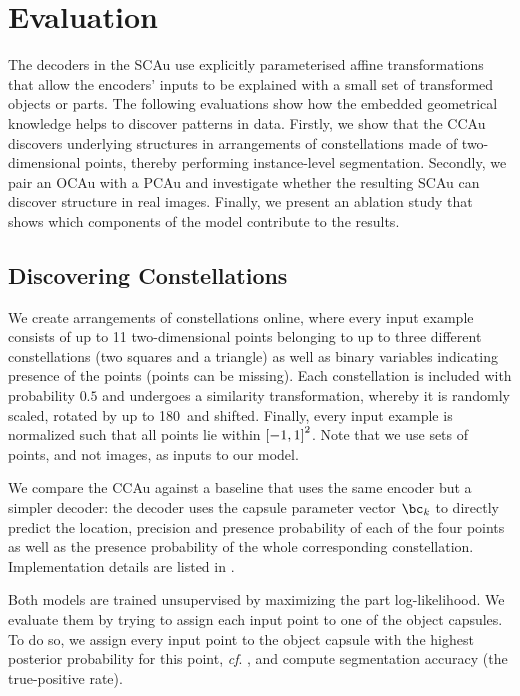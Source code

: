 \section{Evaluation}
\label{sec:sca_experiments}

The decoders in the \gls{SCAu} use explicitly parameterised affine transformations
that allow the encoders' inputs to be explained with a small set of transformed objects or parts. 
The following evaluations show how the embedded geometrical knowledge helps to discover patterns in data.
Firstly, we show that the \gls{CCAu} discovers underlying structures in arrangements of constellations made of two-dimensional points, thereby performing instance-level segmentation.
Secondly, we pair an \gls{OCAu} with a \gls{PCAu} and investigate whether the resulting \gls{SCAu} can discover structure in real images.
Finally, we present an ablation study that shows which components of the model contribute to the results.

\subsection{Discovering Constellations}
\label{sec:constellation_expr}
We create arrangements of constellations online, where every input example consists of up to 11 two-dimensional points belonging to up to three different constellations (two squares and a triangle) as well as binary variables indicating presence of the points (points can be missing).
Each constellation is included with probability $0.5$ and undergoes a similarity transformation, whereby it is randomly scaled, rotated by up to 180\textdegree\ and shifted.
Finally, every input example is normalized such that all points lie within ${\left[-1, 1\right]}^2$.
Note that we use sets of points, and not images, as inputs to our model.

We compare the \gls{CCAu} against a baseline that uses the same encoder but a simpler decoder: the decoder uses the capsule parameter vector $\bc_k$ to directly predict the location, precision and presence probability of each of the four points as well as the presence probability of the whole corresponding constellation. 
Implementation details are listed in 
.

Both models are trained unsupervised by maximizing the part log-likelihood.
We evaluate them by trying to assign each input point to one of the object capsules.
To do so, we assign every input point to the object capsule with the highest posterior probability for this point, \textit{cf}. , and compute segmentation accuracy (\!\ie the true-positive rate).

